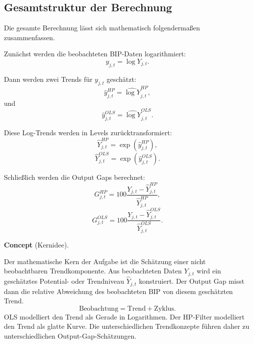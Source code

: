 \documentclass[10pt, letterpaper]{article}
\newcommand{\CustomHeading}[3]{%
  \par\medskip\noindent%
  \textbf{#1 #2} \textnormal{(#3)}.\enskip%
}
\newenvironment{CONC}[2]{\CustomHeading{Concept}{#1}{#2}}{}
\begin{document}
\subsection{Gesamtstruktur der Berechnung}

Die gesamte Berechnung lässt sich mathematisch folgendermaßen zusammenfassen.

Zunächst werden die beobachteten BIP-Daten logarithmiert:
\[
y_{j,t}
=
\log Y_{j,t}.
\]

Dann werden zwei Trends für \(y_{j,t}\) geschätzt:
\[
\widehat{y}_{j,t}^{HP}
=
\widehat{\log Y}_{j,t}^{HP},
\]
und
\[
\widehat{y}_{j,t}^{OLS}
=
\widehat{\log Y}_{j,t}^{OLS}.
\]

Diese Log-Trends werden in Levels zurücktransformiert:
\[
\widehat{Y}_{j,t}^{HP}
=
\exp\left(\widehat{y}_{j,t}^{HP}\right),
\]
\[
\widehat{Y}_{j,t}^{OLS}
=
\exp\left(\widehat{y}_{j,t}^{OLS}\right).
\]

Schließlich werden die Output Gaps berechnet:
\[
G_{j,t}^{HP}
=
100
\frac{
Y_{j,t}-\widehat{Y}_{j,t}^{HP}
}{
\widehat{Y}_{j,t}^{HP}
},
\]
\[
G_{j,t}^{OLS}
=
100
\frac{
Y_{j,t}-\widehat{Y}_{j,t}^{OLS}
}{
\widehat{Y}_{j,t}^{OLS}
}.
\]

\begin{CONC}{}{Kernidee}
Der mathematische Kern der Aufgabe ist die Schätzung einer nicht beobachtbaren Trendkomponente. Aus beobachteten Daten \(Y_{j,t}\) wird ein geschätztes Potential- oder Trendniveau \(\widehat{Y}_{j,t}\) konstruiert. Der Output Gap misst dann die relative Abweichung des beobachteten BIP von diesem geschätzten Trend.
\[
\text{Beobachtung}
=
\text{Trend}
+
\text{Zyklus}.
\]
OLS modelliert den Trend als Gerade in Logarithmen. Der HP-Filter modelliert den Trend als glatte Kurve. Die unterschiedlichen Trendkonzepte führen daher zu unterschiedlichen Output-Gap-Schätzungen.
\end{CONC}



\pagebreak
\printbibliography
\end{document}
